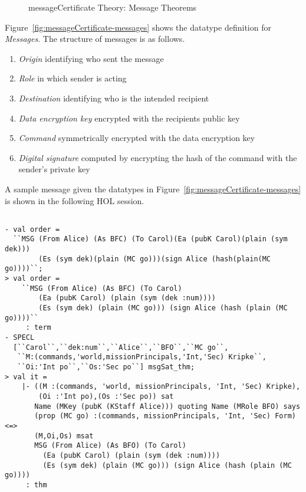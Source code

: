 \begin{figure}[tb]
  \centering
  \begin{minipage}{1.0\linewidth}
    \tealtext{[checkMSGOK]}\vspace*{-0.1in}
    \HOLmessageCertificateTheoremscheckMSGOK
    \vspace*{-0.1in}
    \HOLmessageCertificateTheoremsmsgSatXXthm
  \end{minipage}
  \caption{messageCertificate Theory: Message Theorems}
  \label{fig:messageCertificate-message-theorems}
\end{figure}

Figure~\ref{fig:messageCertificate-messages} shows the datatype
definition for \emph{Messages}. The structure of messages is as
follows.
\begin{enumerate}
\item \emph{Origin} identifying who sent the message
\item \emph{Role} in which sender is acting
\item \emph{Destination} identifying who is the intended recipient
\item \emph{Data encryption key} encrypted with the recipients public key
\item \emph{Command} symmetrically encrypted with the data encryption key
\item \emph{Digital signature} computed by encrypting the hash of the
  command with the sender's private key
\end{enumerate}

A sample message given the datatypes in
Figure~\ref{fig:messageCertificate-messages} is shown in the following
HOL session.
\begin{session}
  \begin{scriptsize}
\begin{verbatim}

- val order = 
  ``MSG (From Alice) (As BFC) (To Carol)(Ea (pubK Carol)(plain (sym dek)))
        (Es (sym dek)(plain (MC go)))(sign Alice (hash(plain(MC go))))``;
> val order =
    ``MSG (From Alice) (As BFC) (To Carol)
        (Ea (pubK Carol) (plain (sym (dek :num))))
        (Es (sym dek) (plain (MC go))) (sign Alice (hash (plain (MC go))))``
     : term
- SPECL 
  [``Carol``,``dek:num``,``Alice``,``BFO``,``MC go``,
   ``M:(commands,'world,missionPrincipals,'Int,'Sec) Kripke``,
   ``Oi:'Int po``,``Os:'Sec po``] msgSat_thm;
> val it =
    |- ((M :(commands, 'world, missionPrincipals, 'Int, 'Sec) Kripke),
        (Oi :'Int po),(Os :'Sec po)) sat
       Name (MKey (pubK (KStaff Alice))) quoting Name (MRole BFO) says
       (prop (MC go) :(commands, missionPrincipals, 'Int, 'Sec) Form) <=>
       (M,Oi,Os) msat
       MSG (From Alice) (As BFO) (To Carol)
         (Ea (pubK Carol) (plain (sym (dek :num))))
         (Es (sym dek) (plain (MC go))) (sign Alice (hash (plain (MC go))))
     : thm
\end{verbatim}
  \end{scriptsize}
\end{session}

